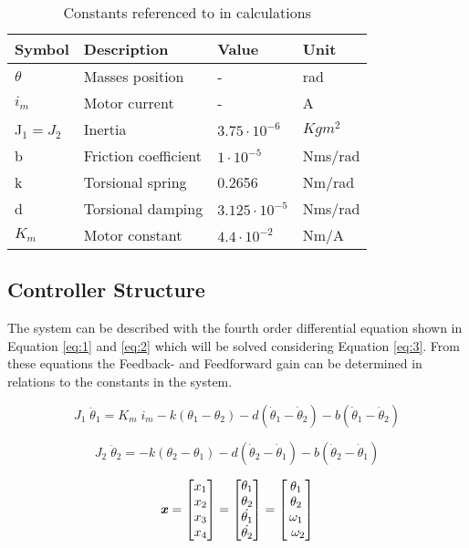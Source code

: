 \begin{table}[htbp]
	\centering
	\caption{Constants referenced to in calculations}
	\begin{tabular}{llll}
		\toprule
		Symbol & Description & Value & Unit\\ 
		\midrule
		$\theta$ & Masses position  & -&rad \\ 
		$i_m$ & Motor current  & - &A \\ 
		J$_1 = J_2$ & Inertia  & $3.75\cdot10^{-6}$&$Kgm^2$  \\ 
		b & Friction  coefficient   &$ 1\cdot10^{-5} $&Nms/rad\\ 
		k & Torsional spring  & 0.2656 &Nm/rad\\
		d & Torsional damping  & $3.125\cdot10^{-5}$&Nms/rad \\ 
		$K_m$ & Motor constant  & $4.4\cdot10^{-2}$&Nm/A  \\ 
		\midrule
	\end{tabular}
	\label{}
\end{table}

 

\subsection{Controller Structure}
 \label{sec:controllerstructure}
The system can be described with the fourth order differential equation shown in Equation \ref{eq:1} and \ref{eq:2} which will be solved considering Equation \ref{eq:3}. From these equations the Feedback- and Feedforward gain can be determined in relations to the constants in the system.

\begin{equation}
J_1 \; \ddot{\theta}_1 = K_m \; i_m - k(\theta_1-\theta_2) - d(\dot{\theta}_1-\dot{\theta}_2) - b(\dot{\theta}_1-\dot{\theta}_2)
\label{eq:1}
\end{equation}

\begin{equation}
J_2 \; \ddot{\theta}_2 = -k(\theta_2-\theta_1) - d(\dot{\theta}_2-\dot{\theta}_1) - b(\dot{\theta}_2-\dot{\theta}_1)
\label{eq:2}
\end{equation}

\begin{equation}
\label{eq:3}
\text{\textit{\textbf{x}}}=
\begin{bmatrix}
x_1\\
x_2 \\
x_3 \\
x_4 
\end{bmatrix}
=
\begin{bmatrix}
\theta_1\\
 \theta_2\\
\dot{\theta_1}\\
\dot{\theta_2}
\end{bmatrix}
=
\begin{bmatrix}
\theta_1\\
\theta_2\\
\omega_1\\
\ \omega_2
\end{bmatrix}
\end{equation}

